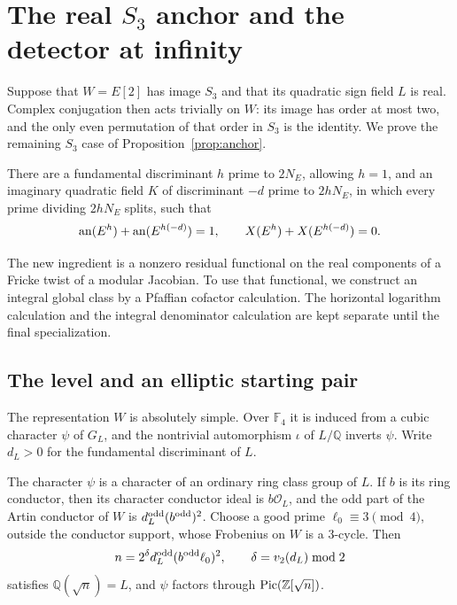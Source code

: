 \section{The real \texorpdfstring{$S_3$}{S3} anchor and the detector at infinity}\label{sec:real}

Suppose that \(W=E[2]\) has image \(S_3\) and that its quadratic
sign field \(L\) is real. Complex conjugation then acts trivially on
\(W\): its image has order at most two, and the only even permutation
of that order in \(S_3\) is the identity. We prove the remaining
\(S_3\) case of Proposition~\ref{prop:anchor}.

\begin{proposition}\label{real:anchor}
There are a fundamental discriminant \(h\) prime to \(2N_E\), allowing
\(h=1\), and an imaginary quadratic field \(K\) of discriminant \(-d\)
prime to \(2hN_E\), in which every prime dividing \(2hN_E\) splits, such
that
\[
 \operatorname{an}(E^h)+\operatorname{an}(E^{h(-d)})=1,
 \qquad X(E^h)+X(E^{h(-d)})=0.
\]
\end{proposition}

The new ingredient is a nonzero residual functional on the real
components of a Fricke twist of a modular Jacobian. To use that
functional, we construct an integral global class by a Pfaffian
cofactor calculation. The horizontal logarithm calculation and the
integral denominator calculation are kept separate until the final
specialization.

\subsection{The level and an elliptic starting pair}

The representation \(W\) is absolutely simple. Over \(\mathbb F_4\) it
is induced from a cubic character \(\psi\) of \(G_L\), and the
nontrivial automorphism \(\iota\) of \(L/\mathbb Q\) inverts \(\psi\).
Write \(d_L>0\) for the fundamental discriminant of \(L\).

\begin{lemma}\label{real:level}
The character \(\psi\) is a character of an ordinary ring class group
of \(L\). If \(b\) is its ring conductor, then its character conductor
ideal is \(b\mathcal O_L\), and the odd part of the Artin conductor of
\(W\) is \(d_L^{\rm odd}(b^{\rm odd})^2\).
Choose a good prime \(\ell_0\equiv3\pmod4\), outside the conductor
support, whose Frobenius on \(W\) is a \(3\)-cycle. Then
\begin{equation}\label{real:level-formula}
 n=2^\delta d_L^{\rm odd}(b^{\rm odd}\ell_0)^2,
 \qquad \delta=v_2(d_L)\bmod2
\end{equation}
satisfies \(\mathbb Q(\sqrt n)=L\), and \(\psi\) factors through
\(\operatorname{Pic}(\mathbb Z[\sqrt n])\).
\end{lemma}


